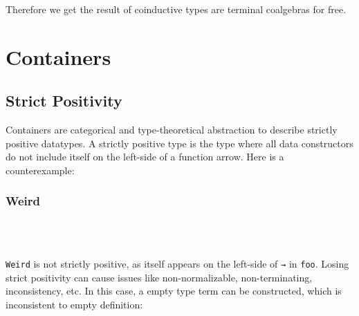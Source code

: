 Therefore we get the result of coinductive types are terminal coalgebras for free.

\section{Containers}

\subsection{Strict Positivity}

Containers are categorical and type-theoretical abstraction to describe strictly positive datatypes. A strictly positive type is the type where all data constructors do not include itself on the left-side of a function arrow. Here is a counterexample:

\subsubsection*{Weird}

\begin{code}%
\>[0]\AgdaSymbol{\{-\#}\AgdaSpace{}%
\AgdaSpace{}%
\AgdaSymbol{\#-\}}\<%
\\
\>[0]\AgdaSpace{}%
\AgdaSpace{}%
\AgdaSymbol{:}\AgdaSpace{}%
\AgdaSpace{}%
\<%
\\
\>[0][@{}l@{\AgdaIndent{0}}]%
\>[2]\AgdaSpace{}%
\AgdaSymbol{:}\AgdaSpace{}%
\AgdaSymbol{(}\AgdaSpace{}%
\AgdaSpace{}%
\AgdaSymbol{)}\AgdaSpace{}%
\AgdaSpace{}%
\<%
\end{code}

\texttt{Weird} is not strictly positive, as itself appears on the left-side of \texttt{→} in \texttt{foo}. Losing strict positivity can cause issues like non-normalizable, non-terminating, inconsistency, etc. In this case, a empty type term can be constructed, which is inconsistent to empty definition:

\begin{code}%
\>[0]\AgdaSpace{}%
\AgdaSymbol{:}\AgdaSpace{}%
\AgdaSpace{}%
\AgdaSpace{}%
\<%
\\
\>[0]\AgdaSpace{}%
\AgdaSymbol{(}\AgdaSpace{}%
\AgdaSymbol{)}\AgdaSpace{}%
\AgdaSymbol{=}\AgdaSpace{}%
\AgdaSpace{}%
\AgdaSymbol{(}\AgdaSpace{}%
\AgdaSymbol{)}\<%
\\
%
\\[\AgdaEmptyExtraSkip]%
\>[0]\AgdaSpace{}%
\AgdaSymbol{:}\AgdaSpace{}%
\<%
\\
\>[0]\AgdaSpace{}%
\AgdaSymbol{=}\AgdaSpace{}%
\AgdaSpace{}%
\AgdaSymbol{(}\AgdaSpace{}%
\AgdaSymbol{)}\<%
\end{code}

